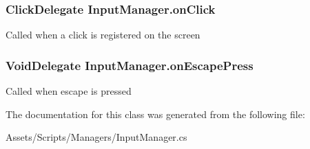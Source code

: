 \subsubsection[{\texorpdfstring{on\+Click}{onClick}}]{\setlength{\rightskip}{0pt plus 5cm}Click\+Delegate Input\+Manager.\+on\+Click\hspace{0.3cm}{\ttfamily [static]}}\hypertarget{class_input_manager_a1cc95536c19ed45ce645e20aca69755e}{}\label{class_input_manager_a1cc95536c19ed45ce645e20aca69755e}


Called when a click is registered on the screen 

\subsubsection[{\texorpdfstring{on\+Escape\+Press}{onEscapePress}}]{\setlength{\rightskip}{0pt plus 5cm}Void\+Delegate Input\+Manager.\+on\+Escape\+Press\hspace{0.3cm}{\ttfamily [static]}}\hypertarget{class_input_manager_a81a585645cea9e8936c148e0b653df36}{}\label{class_input_manager_a81a585645cea9e8936c148e0b653df36}


Called when escape is pressed 



The documentation for this class was generated from the following file\+:\begin{DoxyCompactItemize}
\item 
Assets/\+Scripts/\+Managers/Input\+Manager.\+cs\end{DoxyCompactItemize}
